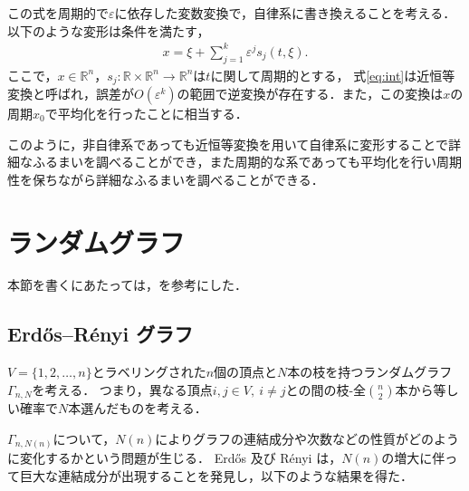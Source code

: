 \documentclass[../main]{subfiles}
\begin{document}
この式を周期的で$\varepsilon$に依存した変数変換で，自律系に書き換えることを考える．
以下のような変形は条件を満たす，
\begin{align}
    \label{eq:int}
    x=\xi+\sum_{j=1}^k \varepsilon^j s_j(t,\xi).
\end{align}
ここで，$x\in\mathbb{R}^n$，$s_j:\mathbb{R}\times\mathbb{R}^n\to\mathbb{R}^n$は$t$に関して周期的とする，
式\eqref{eq:int}は近恒等変換と呼ばれ，誤差が$O(\varepsilon^k)$の範囲で逆変換が存在する．また，この変換は$x$の周期$x_0$で平均化を行ったことに相当する．

このように，非自律系であっても近恒等変換を用いて自律系に変形することで詳細なふるまいを調べることができ，また周期的な系であっても平均化を行い周期性を保ちながら詳細なふるまいを調べることができる．
\section{ランダムグラフ}
本節を書くにあたっては，\cite{Bollobas2013,Albert2002}を参考にした．
\subsection{Erd\H{o}s–R\'{e}nyi グラフ}
$V=\{1,2,\ldots,n\}$とラベリングされた$n$個の頂点と$N$本の枝を持つランダムグラフ$\Gamma_{n,N}$を考える．
つまり，異なる頂点$i,j\in V,\ i\neq j$との間の枝-全$\binom{n}{2}$本から等しい確率で$N$本選んだものを考える．

$\Gamma_{n,N(n)}$について，$N(n)$によりグラフの連結成分や次数などの性質がどのように変化するかという問題が生じる．
Erd\H{o}s 及び R\'{e}nyi は，$N(n)$の増大に伴って巨大な連結成分が出現することを発見し，以下のような結果を得た．
\end{document}
